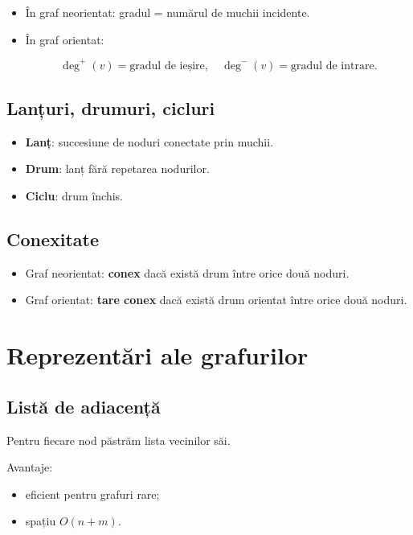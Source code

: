\documentclass[12pt]{article}
\begin{document}
\begin{itemize}
    \item În graf neorientat: gradul = numărul de muchii incidente.
    \item În graf orientat:
    

\[
    \deg^+(v) = \text{gradul de ieșire}, \quad
    \deg^-(v) = \text{gradul de intrare}.
    \]


\end{itemize}

\subsection{Lanțuri, drumuri, cicluri}

\begin{itemize}
    \item \textbf{Lanț}: succesiune de noduri conectate prin muchii.
    \item \textbf{Drum}: lanț fără repetarea nodurilor.
    \item \textbf{Ciclu}: drum închis.
\end{itemize}

\subsection{Conexitate}

\begin{itemize}
    \item Graf neorientat: \textbf{conex} dacă există drum între orice două noduri.
    \item Graf orientat: \textbf{tare conex} dacă există drum orientat între orice două noduri.
\end{itemize}

\section{Reprezentări ale grafurilor}

\subsection{Listă de adiacență}

Pentru fiecare nod păstrăm lista vecinilor săi.

Avantaje:
\begin{itemize}
    \item eficient pentru grafuri rare;
    \item spațiu $O(n + m)$.
\end{itemize}
\end{document}
